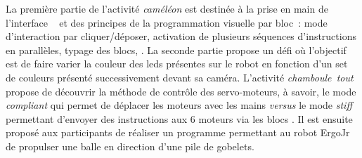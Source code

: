                 La première partie de l'activité \textit{caméléon} est destinée à la prise en main de l'interface ~ et des principes de la programmation visuelle par bloc~: mode d'interaction par cliquer/déposer, activation de plusieurs séquences d'instructions en parallèles, typage des blocs, \etc. La seconde partie propose un défi où l'objectif est de faire varier la couleur des leds présentes sur le robot en fonction d'un set de couleurs présenté successivement devant sa caméra.
                L'activité \textit{chamboule~tout} propose de découvrir la méthode de contrôle des servo-moteurs, à savoir, le mode \textit{compliant} qui permet de déplacer les moteurs avec les mains \textit{versus} le mode \textit{stiff} permettant d'envoyer des instructions  aux 6 moteurs via les blocs . Il est ensuite proposé aux participants de réaliser un programme permettant au robot ErgoJr de propulser une balle en direction d'une pile de gobelets.
